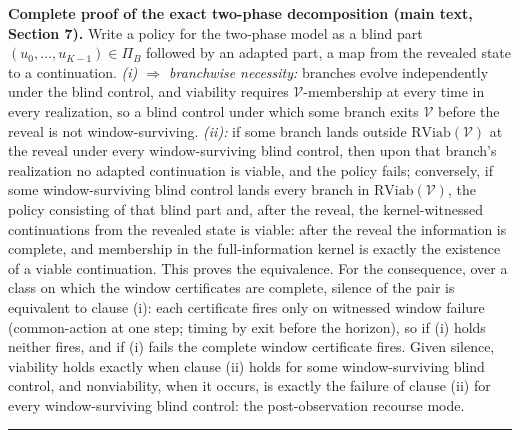 \documentclass[11pt]{article}
\theoremstyle{definition}
\begin{document}
\bigskip
\noindent\textbf{Complete proof of the exact two-phase decomposition (main text,
Section 7).} Write a policy for the two-phase model as a blind part
\((u_{0},\dots,u_{K-1}) \in \Pi_{B}\) followed by an adapted part, a map from the revealed
state to a continuation. \emph{(i) \(\Rightarrow\) branchwise necessity:} branches evolve
independently under the blind control, and viability requires \(\mathcal{V}\)-membership at
every time in every realization, so a blind control under which some branch exits
\(\mathcal{V}\) before the reveal is not window-surviving. \emph{(ii):} if some branch lands
outside \(\mathrm{RViab}(\mathcal{V})\) at the reveal under every window-surviving blind
control, then upon that branch's realization no adapted continuation is viable, and the
policy fails; conversely, if some window-surviving blind control lands every branch in
\(\mathrm{RViab}(\mathcal{V})\), the policy consisting of that blind part and, after the
reveal, the kernel-witnessed continuations from the revealed state is viable: after the
reveal the information is complete, and membership in the full-information kernel is
exactly the existence of a viable continuation. This proves the equivalence. For the
consequence, over a class on which the window certificates are complete, silence of the
pair is equivalent to clause (i): each certificate fires only on witnessed window failure
(common-action at one step; timing by exit before the horizon), so if (i) holds neither
fires, and if (i) fails the complete window certificate fires. Given silence, viability
holds exactly when clause (ii) holds for some window-surviving blind control, and
nonviability, when it occurs, is exactly the failure of clause (ii) for every
window-surviving blind control: the post-observation recourse mode.
\rule{0.5\linewidth}{0.5pt}
\end{document}
